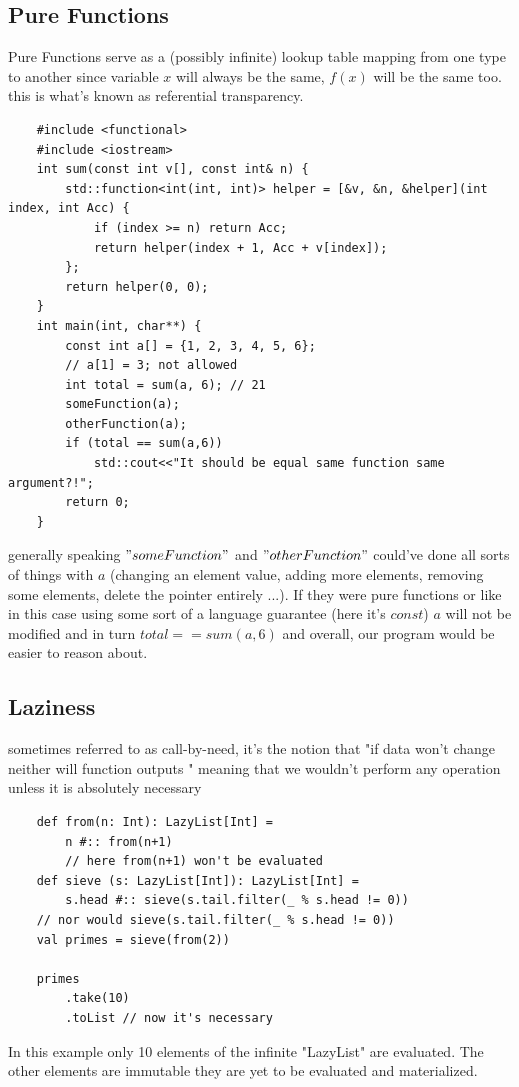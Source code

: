 \documentclass[12pt,twoside]{article}
\begin{document}
\subsection{Pure Functions}
Pure Functions serve as a (possibly infinite) lookup table mapping from one type to another since variable $x$ will always be the same, $f(x)$ will be the same too. this is what's known as referential transparency.
\lstset{style=cpp}
\begin{lstlisting}
    #include <functional>
    #include <iostream>
    int sum(const int v[], const int& n) {
        std::function<int(int, int)> helper = [&v, &n, &helper](int index, int Acc) {
            if (index >= n) return Acc;
            return helper(index + 1, Acc + v[index]);
        };
        return helper(0, 0);
    }
    int main(int, char**) {
        const int a[] = {1, 2, 3, 4, 5, 6};
        // a[1] = 3; not allowed
        int total = sum(a, 6); // 21
        someFunction(a);
        otherFunction(a);
        if (total == sum(a,6))
            std::cout<<"It should be equal same function same argument?!";
        return 0;
    }
\end{lstlisting}
generally speaking $"someFunction"$ and $"otherFunction"$ could've done all sorts of things with $a$ (changing an element value, adding more elements, removing some elements, delete the pointer entirely ...). If they were pure functions or like in this case using some sort of a language guarantee (here it's $const$) $a$ will not be modified and in turn $total == sum(a,6)$ and overall, our program would be easier to reason about.

\subsection{Laziness}
sometimes referred to as call-by-need, it's the notion that "if data won't change neither will function outputs " meaning that we wouldn't perform any operation unless it is absolutely necessary 
\lstset{style=scala}
\begin{lstlisting}
    def from(n: Int): LazyList[Int] = 
        n #:: from(n+1) 
        // here from(n+1) won't be evaluated
    def sieve (s: LazyList[Int]): LazyList[Int] = 
        s.head #:: sieve(s.tail.filter(_ % s.head != 0)) 
    // nor would sieve(s.tail.filter(_ % s.head != 0))
    val primes = sieve(from(2))

    primes
        .take(10)
        .toList // now it's necessary

\end{lstlisting}
In this example only 10 elements of the infinite "LazyList" are evaluated. The other elements are immutable they are yet to be evaluated and materialized.
\end{document}
